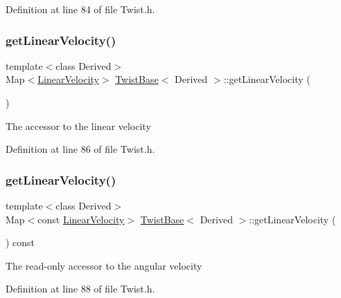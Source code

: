 Definition at line 84 of file Twist.\+h.

\hypertarget{class_twist_base_a8056931a50cd7fa4f0d75f70470b0907}{}\label{class_twist_base_a8056931a50cd7fa4f0d75f70470b0907} 
\subsubsection{\texorpdfstring{get\+Linear\+Velocity()}{getLinearVelocity()}\hspace{0.1cm}{\footnotesize\ttfamily [1/2]}}
{\footnotesize\ttfamily template$<$class Derived$>$ \\
Map$<$\hyperlink{class_twist_base_aeafbc7a3ca37e08812be0af7e680190b}{Linear\+Velocity}$>$ \hyperlink{class_twist_base}{Twist\+Base}$<$ Derived $>$\+::get\+Linear\+Velocity (\begin{DoxyParamCaption}{ }\end{DoxyParamCaption})\hspace{0.3cm}{\ttfamily [inline]}}

The accessor to the linear velocity 

Definition at line 86 of file Twist.\+h.

\hypertarget{class_twist_base_ae0ea0ad07e9f5547cd18a8f6eb953792}{}\label{class_twist_base_ae0ea0ad07e9f5547cd18a8f6eb953792} 
\subsubsection{\texorpdfstring{get\+Linear\+Velocity()}{getLinearVelocity()}\hspace{0.1cm}{\footnotesize\ttfamily [2/2]}}
{\footnotesize\ttfamily template$<$class Derived$>$ \\
Map$<$const \hyperlink{class_twist_base_aeafbc7a3ca37e08812be0af7e680190b}{Linear\+Velocity}$>$ \hyperlink{class_twist_base}{Twist\+Base}$<$ Derived $>$\+::get\+Linear\+Velocity (\begin{DoxyParamCaption}{ }\end{DoxyParamCaption}) const\hspace{0.3cm}{\ttfamily [inline]}}

The read-\/only accessor to the angular velocity 

Definition at line 88 of file Twist.\+h.

